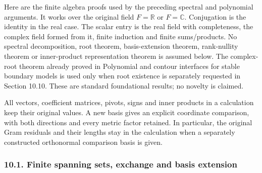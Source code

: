 \documentclass[
  11pt,
]{article}
\begin{document}
Here are the finite algebra proofs used by the preceding spectral and
polynomial arguments. It works over the original field \(F=\mathbb R\)
or \(F=\mathbb C\). Conjugation is the identity in the real case. The
scalar entry is the real field with completeness, the complex field
formed from it, finite induction and finite sums/products. No spectral
decomposition, root theorem, basis-extension theorem, rank-nullity
theorem or inner-product representation theorem is assumed below. The
complex-root theorem already proved in Polynomial and contour interfaces
for stable boundary models is used only when root existence is
separately requested in Section 10.10. These are standard foundational
results; no novelty is claimed.

All vectors, coefficient matrices, pivots, signs and inner products in a
calculation keep their original values. A new basis gives an explicit
coordinate comparison, with both directions and every metric factor
retained. In particular, the original Gram residuals and their lengths
stay in the calculation when a separately constructed orthonormal
comparison basis is given.

\subsubsection{10.1. Finite spanning sets, exchange and basis
extension}\label{finite-spanning-sets-exchange-and-basis-extension}
\end{document}

